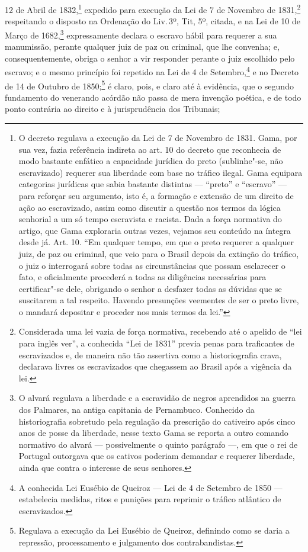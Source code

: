 12 de Abril de 1832,\footnote{O decreto regulava a execução da Lei de 7
  de Novembro de 1831. Gama, por sua vez, fazia referência indireta ao
  art. 10 do decreto que reconhecia de modo bastante enfático a
  capacidade jurídica do preto (sublinhe"-se, não escravizado) requerer
  sua liberdade com base no tráfico ilegal. Gama equipara categorias
  jurídicas que sabia bastante distintas --- ``preto'' e ``escravo'' --- para
  reforçar seu argumento, isto é, a formação e extensão de um direito de
  ação ao escravizado, assim como discutir a questão nos termos da
  lógica senhorial a um só tempo escravista e racista. Dada a força
  normativa do artigo, que Gama exploraria outras vezes, vejamos seu conteúdo na
  íntegra desde já. Art. 10. ``Em qualquer tempo, em que o preto requerer
  a qualquer juiz, de paz ou criminal, que veio para o Brasil depois da
  extinção do tráfico, o juiz o interrogará sobre todas as
  circunstâncias que possam esclarecer o fato, e oficialmente procederá
  a todas as diligências necessárias para certificar"-se dele, obrigando
  o senhor a desfazer todas as dúvidas que se suscitarem a tal respeito.
  Havendo presunções veementes de ser o preto livre, o mandará depositar
  e proceder nos mais termos da lei.''} expedido para execução da Lei de
7 de Novembro de 1831,\footnote{Considerada uma lei vazia de força
  normativa, recebendo até o apelido de ``lei para inglês ver'', a
  conhecida ``Lei de 1831'' previa penas para traficantes de escravizados
  e, de maneira não tão assertiva como a historiografia crava, declarava
  livres os escravizados que chegassem ao Brasil após a vigência da lei.}
respeitando o disposto na Ordenação do Liv.\,3º, Tit, 5º, citada, e na
Lei de 10 de Março de 1682,\footnote{O alvará regulava a liberdade e a
  escravidão de negros aprendidos na guerra dos Palmares, na antiga
  capitania de Pernambuco. Conhecido da historiografia sobretudo pela
  regulação da prescrição do cativeiro após cinco anos de posse da
  liberdade, nesse texto Gama se reporta a outro comando normativo do
  alvará --- possivelmente o quinto parágrafo ---, em que o rei de Portugal
  outorgava que os cativos poderiam demandar e requerer liberdade, ainda
  que contra o interesse de seus senhores.} expressamente declara o escravo
hábil para requerer a sua manumissão, perante qualquer juiz de paz ou
criminal, que lhe convenha; e, consequentemente, obriga o senhor a vir
responder perante o juiz escolhido pelo escravo; e o mesmo princípio foi
repetido na Lei de 4 de Setembro,\footnote{A conhecida Lei Eusébio de
  Queiroz --- Lei de 4 de Setembro de 1850 --- estabelecia medidas, ritos e
  punições para reprimir o tráfico atlântico de escravizados.} e no
Decreto de 14 de Outubro de 1850;\footnote{Regulava a execução da Lei
  Eusébio de Queiroz, definindo como se daria a repressão, processamento
  e julgamento dos contrabandistas.} é claro, pois, e claro até à
evidência, que o segundo fundamento do venerando acórdão não passa de
mera invenção poética, e de todo ponto contrária ao direito e à
jurisprudência dos Tribunais;

